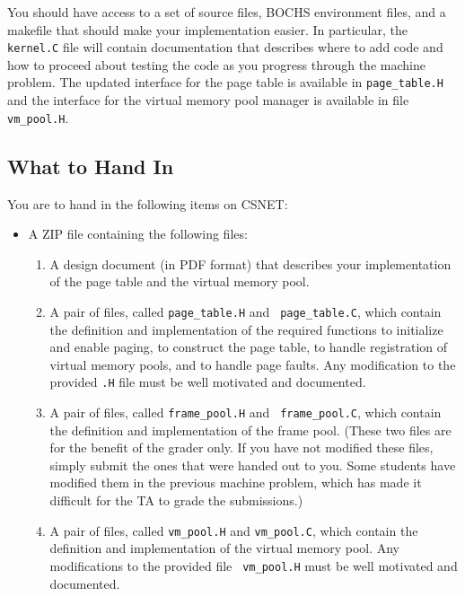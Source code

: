 \documentclass[letterpaper,11pt]{article}
\begin{document}
{You should have access to a set of source files, BOCHS environment
files, and a makefile that should make your implementation easier. In
particular, the {\tt kernel.C} file will contain documentation that
describes where to add code and how to proceed about testing the code
as you progress through the machine problem. The updated interface for the page table is 
available in {\tt page\_table.H} and the interface for the virtual memory pool manager
is available in file {\tt vm\_pool.H}.

\subsection*{What to Hand In}
You are to hand in the following items on CSNET:
\begin{itemize}
\item A ZIP file containing the following files:
  \begin{enumerate}
  \item A design document (in PDF format) that describes your
    implementation of the page table and the virtual memory pool.
  \item A pair of files, called {\tt page\_table.H} and {\tt
      page\_table.C}, which contain the definition and implementation
    of the required functions to initialize and enable paging, to
    construct the page table, to handle registration of virtual memory
    pools, and to handle page faults.  Any modification to the
    provided {\tt .H} file must be well motivated and documented.
  \item A pair of files, called {\tt frame\_pool.H} and {\tt
      frame\_pool.C}, which contain the definition and implementation
    of the frame pool. (These two files are for the benefit of the
    grader only. If you have not modified these files, simply submit
    the ones that were handed out to you. Some students have modified
    them in the previous machine problem, which has made it difficult for the TA
    to grade the submissions.)
  \item A pair of files, called {\tt vm\_pool.H} and {\tt vm\_pool.C},
    which contain the definition and implementation of the virtual
    memory pool. Any modifications to the provided file {\tt
      vm\_pool.H} must be well motivated and documented.
  \end{enumerate}


\end{itemize}}
\end{document}
